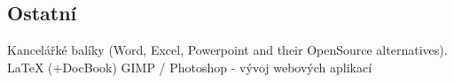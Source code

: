 \documentclass[letterpaper]{deedy-resume.cz} %
\begin{document}
\begin{minipage}[t]{0.60\textwidth}
\subsection{Ostatní}
Kancelářké balíky (Word, Excel, Powerpoint and their OpenSource alternatives). \\
LaTeX (+DocBook) \textbullet{} GIMP / Photoshop - vývoj webových aplikací \\

\end{minipage} %

\end{document}
